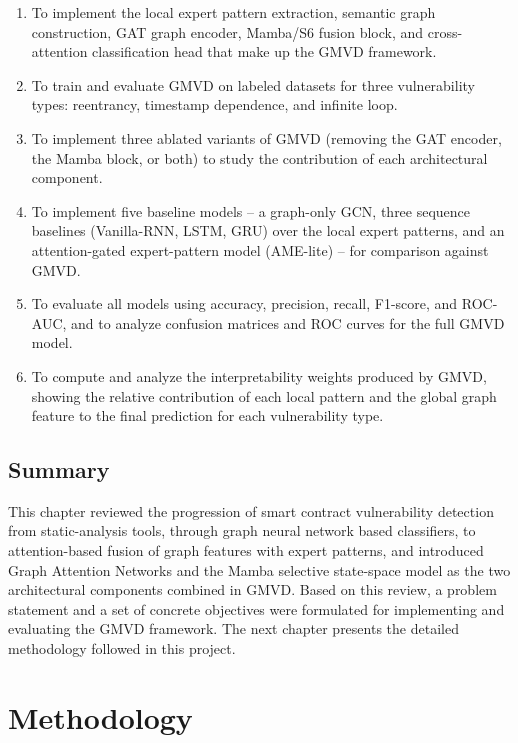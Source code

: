 \documentclass[12pt, a4paper, openright, twoside]{report}
\begin{document}
\begin{enumerate}
    \item To implement the local expert pattern extraction, semantic graph construction, GAT graph encoder, Mamba/S6 fusion block, and cross-attention classification head that make up the GMVD framework.

    \item To train and evaluate GMVD on labeled datasets for three vulnerability types: reentrancy, timestamp dependence, and infinite loop.

    \item To implement three ablated variants of GMVD (removing the GAT encoder, the Mamba block, or both) to study the contribution of each architectural component.

    \item To implement five baseline models -- a graph-only GCN, three sequence baselines (Vanilla-RNN, LSTM, GRU) over the local expert patterns, and an attention-gated expert-pattern model (AME-lite) -- for comparison against GMVD.

    \item To evaluate all models using accuracy, precision, recall, F1-score, and ROC-AUC, and to analyze confusion matrices and ROC curves for the full GMVD model.

    \item To compute and analyze the interpretability weights produced by GMVD, showing the relative contribution of each local pattern and the global graph feature to the final prediction for each vulnerability type.

\end{enumerate}

\section{Summary}
This chapter reviewed the progression of smart contract vulnerability detection from static-analysis tools, through graph neural network based classifiers, to attention-based fusion of graph features with expert patterns, and introduced Graph Attention Networks and the Mamba selective state-space model as the two architectural components combined in GMVD. Based on this review, a problem statement and a set of concrete objectives were formulated for implementing and evaluating the GMVD framework. The next chapter presents the detailed methodology followed in this project.

\chapter{Methodology}
\label{methodology}
\end{document}
